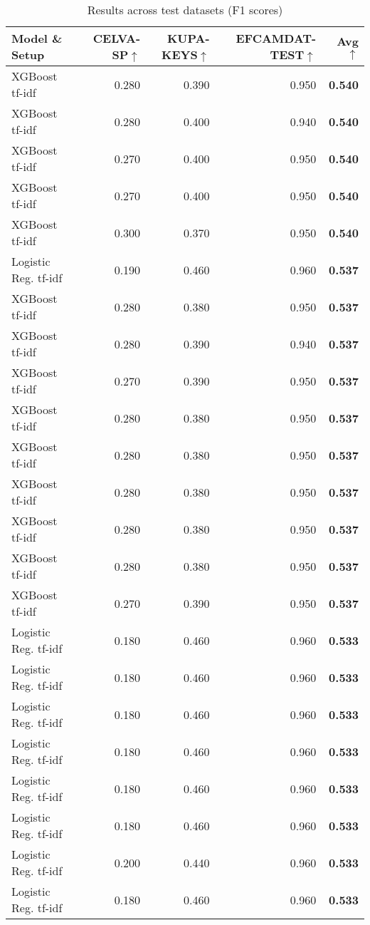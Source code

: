\begin{table*}[ht]
\centering
\small
\caption{Results across test datasets (F1 scores)}
\begin{tabular}{l r r r r }
\hline
Model \& Setup & CELVA-SP$\uparrow$ & KUPA-KEYS$\uparrow$ & EFCAMDAT-TEST$\uparrow$ & Avg$\uparrow$ \\
\hline
XGBoost tf-idf & 0.280 & 0.390 & 0.950 & \textbf{0.540} \\
XGBoost tf-idf & 0.280 & 0.400 & 0.940 & \textbf{0.540} \\
XGBoost tf-idf & 0.270 & 0.400 & 0.950 & \textbf{0.540} \\
XGBoost tf-idf & 0.270 & 0.400 & 0.950 & \textbf{0.540} \\
XGBoost tf-idf & 0.300 & 0.370 & 0.950 & \textbf{0.540} \\
Logistic Reg. tf-idf & 0.190 & 0.460 & 0.960 & \textbf{0.537} \\
XGBoost tf-idf & 0.280 & 0.380 & 0.950 & \textbf{0.537} \\
XGBoost tf-idf & 0.280 & 0.390 & 0.940 & \textbf{0.537} \\
XGBoost tf-idf & 0.270 & 0.390 & 0.950 & \textbf{0.537} \\
XGBoost tf-idf & 0.280 & 0.380 & 0.950 & \textbf{0.537} \\
XGBoost tf-idf & 0.280 & 0.380 & 0.950 & \textbf{0.537} \\
XGBoost tf-idf & 0.280 & 0.380 & 0.950 & \textbf{0.537} \\
XGBoost tf-idf & 0.280 & 0.380 & 0.950 & \textbf{0.537} \\
XGBoost tf-idf & 0.280 & 0.380 & 0.950 & \textbf{0.537} \\
XGBoost tf-idf & 0.270 & 0.390 & 0.950 & \textbf{0.537} \\
Logistic Reg. tf-idf & 0.180 & 0.460 & 0.960 & \textbf{0.533} \\
Logistic Reg. tf-idf & 0.180 & 0.460 & 0.960 & \textbf{0.533} \\
Logistic Reg. tf-idf & 0.180 & 0.460 & 0.960 & \textbf{0.533} \\
Logistic Reg. tf-idf & 0.180 & 0.460 & 0.960 & \textbf{0.533} \\
Logistic Reg. tf-idf & 0.180 & 0.460 & 0.960 & \textbf{0.533} \\
Logistic Reg. tf-idf & 0.180 & 0.460 & 0.960 & \textbf{0.533} \\
Logistic Reg. tf-idf & 0.200 & 0.440 & 0.960 & \textbf{0.533} \\
Logistic Reg. tf-idf & 0.180 & 0.460 & 0.960 & \textbf{0.533} \\

\end{tabular}
\end{table*}
